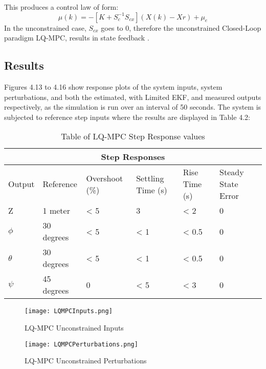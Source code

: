 \documentclass[12pt,a4paper,twoside]{report}
\begin{document}
				This produces a control law of form:
				\begin{equation}
					\mu(k) = - [K + S_c^{-1}S_{cx}]( X(k)- Xr) + \mu_e
				\end{equation}
				In the unconstrained case, $S_{cx}$ goes to 0, therefore the unconstrained Closed-Loop paradigm LQ-MPC, results in state feedback \cite{26}.
				
			\subsection{Results}
				Figures 4.13 to 4.16 show response plots of the system inputs, system perturbations, and both the estimated, with Limited EKF, and measured outputs respectively, as the simulation is run over an interval of 50 seconds. The system is subjected to reference step inputs where the results are displayed in Table 4.2:
				\\
				\begin{table}[h!]
					\centering
					\begin{tabular}{ |p{1.5cm}|p{3cm}|p{2cm}|p{2cm}|p{2cm}|p{2cm}|  }
						\hline
						\multicolumn{6}{|c|}{Step Responses} \\
						\hline
						Output   &  Reference  & Overshoot (\%) & Settling Time (s) & Rise Time (s) & Steady State Error \\
						\hline
						Z        &  1 meter         & < 5 &  3   & < 2   & 0\\
						$\phi$   &  30 degrees      & < 5 & < 1  & < 0.5 & 0\\
						$\theta$ &  30 degrees      & < 5 & < 1  & < 0.5 & 0\\
						$\psi$   & 	45 degrees      & 0   & < 5  & < 3   & 0\\
						\hline
					\end{tabular}
					\caption{Table of LQ-MPC Step Response values}
					\label{table:lqmpcstepresponses}
				\end{table}
				
				\begin{figure}[h!]
					\centering
					\begin{minipage}{0.5\textwidth}
						\centering
						\texttt{[image: LQMPCInputs.png]}
						\caption{LQ-MPC Unconstrained Inputs}
						\label{fig:lqmpcunconstrainedinputs}
					\end{minipage}\hfill
					\begin{minipage}{0.5\textwidth}
						\centering
						\texttt{[image: LQMPCPerturbations.png]}
						\caption{LQ-MPC Unconstrained Perturbations}
						\label{fig:lqmpcunconstrainedperturbations}
					\end{minipage}
				\end{figure}
			
\end{document}

